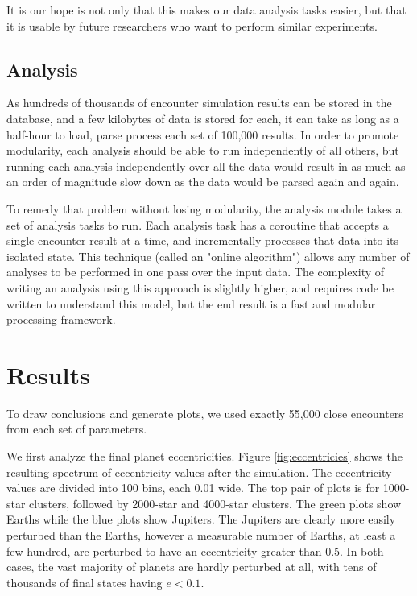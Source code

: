 \documentclass[12pt]{article}
\begin{document}
    It is our hope is not only that this makes our data analysis tasks easier, but
    that it is usable by future researchers who want to perform similar experiments.

    \subsection{Analysis}

    As hundreds of thousands of encounter simulation results can be stored
    in the database, and a few kilobytes of data is stored for each, 
    it can take as long as a half-hour to load, parse process each set of 100,000 results.
    In order to promote modularity, each analysis should be able to run independently
    of all others, but running each analysis independently over all the data would result
    in as much as an order of magnitude slow down as the data would be parsed again and
    again.

    To remedy that problem without losing modularity, the analysis module takes a
    set of analysis tasks to run. Each analysis task has a coroutine that accepts a
    single encounter result at a time, and incrementally processes that data into 
    its isolated state. This technique (called an "online algorithm") allows any number
    of analyses to be performed in one pass over the input data. The complexity of writing
    an analysis using this approach is slightly higher, and requires code be written
    to understand this model, but the end result is a fast and modular processing framework.

\section{Results}

    To draw conclusions and generate plots, we used exactly 55,000 close encounters from
    each set of parameters.

    We first analyze the final planet eccentricities. Figure \ref{fig:eccentricies} shows
    the resulting spectrum of eccentricity values after the simulation. The eccentricity
    values are divided into 100 bins, each 0.01 wide. The top pair
    of plots is for 1000-star clusters, followed by 2000-star and 4000-star clusters.
    The green plots show Earths while the blue plots show Jupiters. The Jupiters are
    clearly more easily perturbed than the Earths, however a measurable number of Earths,
    at least a few hundred, are perturbed to have an eccentricity greater than 0.5. In both
    cases, the vast majority of planets are hardly perturbed at all, with tens of thousands
    of final states having $e<0.1$.
\end{document}

